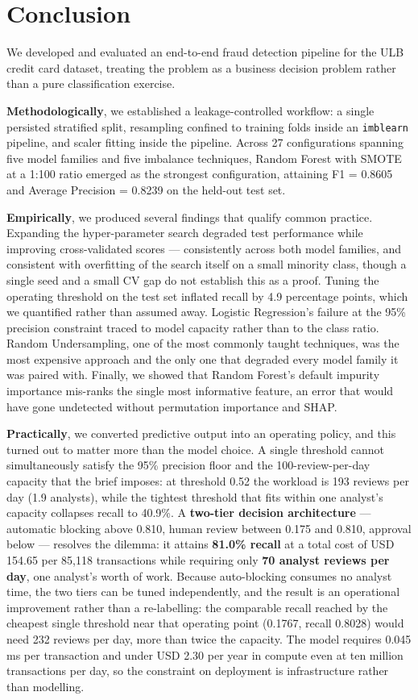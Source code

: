 \section{Conclusion}

We developed and evaluated an end-to-end fraud detection pipeline for the ULB
credit card dataset, treating the problem as a business decision problem rather
than a pure classification exercise.

\textbf{Methodologically}, we established a leakage-controlled workflow: a
single persisted stratified split, resampling confined to training folds
inside an \texttt{imblearn} pipeline, and scaler fitting inside the pipeline.
Across 27 configurations spanning five model families and five imbalance
techniques, Random Forest with SMOTE at a 1:100 ratio emerged as the strongest
configuration, attaining F1 = 0.8605 and Average Precision = 0.8239 on the
held-out test set.

\textbf{Empirically}, we produced several findings that qualify common
practice. Expanding the hyper-parameter search degraded test performance while
improving cross-validated scores --- consistently across both model families,
and consistent with overfitting of the search itself on a small minority class,
though a single seed and a small CV gap do not establish this as a proof. Tuning the operating threshold on the test set
inflated recall by 4.9 percentage points, which we quantified rather than
assumed away. Logistic Regression's failure at the 95\% precision constraint
traced to model capacity rather than to the class ratio. Random Undersampling,
one of the most commonly taught techniques, was the most expensive approach and
the only one that degraded every model family it was paired with. Finally, we
showed that Random Forest's default impurity importance mis-ranks the single
most informative feature, an error that would have gone undetected without
permutation importance and SHAP.

\textbf{Practically}, we converted predictive output into an operating policy,
and this turned out to matter more than the model choice. A single threshold
cannot simultaneously satisfy the 95\% precision floor and the
100-review-per-day capacity that the brief imposes: at threshold 0.52 the
workload is 193 reviews per day (1.9 analysts), while the tightest threshold
that fits within one analyst's capacity collapses recall to 40.9\%. A
\textbf{two-tier decision architecture} --- automatic blocking above 0.810,
human review between 0.175 and 0.810, approval below --- resolves the
dilemma: it attains \textbf{81.0\% recall} at a total cost of USD 154.65 per
85{,}118 transactions while requiring only \textbf{70 analyst reviews per
day}, one analyst's worth of work. Because auto-blocking consumes no analyst
time, the two tiers can be tuned independently, and the result is an
operational improvement rather than a re-labelling: the comparable recall
reached by the cheapest single threshold near that operating point (0.1767,
recall 0.8028) would need 232 reviews per day, more than twice the capacity. The model requires
0.045 ms per transaction and under USD 2.30 per year in compute even at ten
million transactions per day, so the constraint on deployment is
infrastructure rather than modelling.

